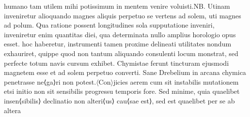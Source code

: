 humano tam utilem mihi potissimum in mentem venire voluisti.\pend \pstart  NB. Utinam inveniretur alioquando magnes\protect{} aliquis  perpetuo se vertens ad solem\protect{}, uti magnes\protect{} ad polum\protect{}. Qua ratione possent longitudines\protect{} sola supputatione inveniri, inveniretur enim quantitas diei, qua determinata nullo amplius horologio\protect{}  opus esset.  hoc haberetur, instrumenti tamen proxime delineati utilitates nondum exhauriret, quippe quod non tantum aliquando consulenti locum monstrat, sed perfecte totum navis\protect{} cursum exhibet. Chymistae ferunt tincturam ejusmodi magnetem\protect{} esse et ad solem\protect{} perpetuo converti. Sane Drebelium\protect{} in arcana chymica penetrasse ne⟨ga⟩ri non potest.\pend \pstart $\langle$Con$\rangle$jicies aerem cum sit instabilis mutationem etsi initio non sit sensibilis progressu temporis fore. Sed minime, quia quaelibet insen⟨sibilis⟩ declinatio\protect{} non alteri⟨us⟩ cau⟨sae est⟩, sed est quaelibet per se ab altera 